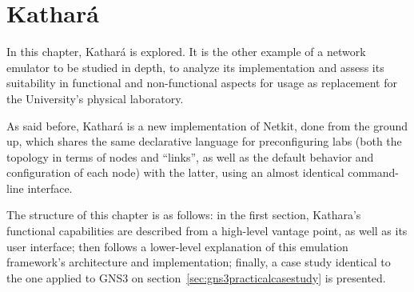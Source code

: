 
\chapter{Kathará}
\label{ch:kathara}

In this chapter, Kathará is explored. It is the other example of a network emulator to be studied in depth, to analyze its implementation and assess its suitability in functional and non-functional aspects for usage as replacement for the University's physical laboratory.

As said before, Kathará is a new implementation of Netkit, done from the ground up, which shares the same declarative language for preconfiguring labs (both the topology in terms of nodes and ``links'', as well as the default behavior and configuration of each node) with the latter, using an almost identical command-line interface.


The structure of this chapter is as follows: in the first section, Kathara's functional capabilities are described from a high-level vantage point, as well as its user interface; then follows a lower-level explanation of this emulation framework's architecture and implementation; finally, a case study identical to the one applied to GNS3 on section~\ref{sec:gns3practicalcasestudy} is presented.







